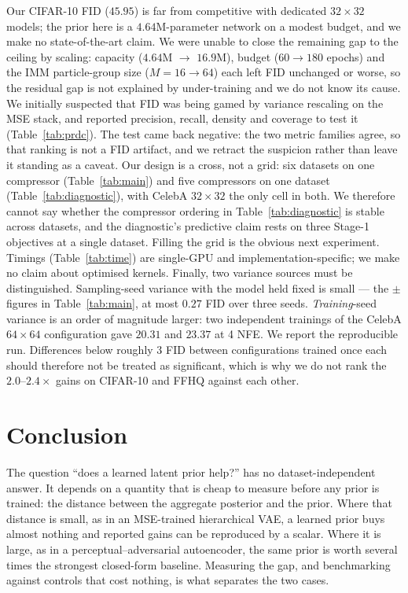 \documentclass[sigconf,nonacm]{acmart}
\begin{document}
Our CIFAR-10 FID ($45.95$) is far from competitive with dedicated
$32{\times}32$ models; the prior here is a $4.64$M-parameter network on a
modest budget, and we make no state-of-the-art claim. We were unable to close
the remaining gap to the ceiling by scaling: capacity ($4.64$M $\to$ $16.9$M),
budget ($60 \to 180$ epochs) and the IMM particle-group size ($M{=}16 \to 64$)
each left FID unchanged or worse, so the residual gap is not explained by
under-training and we do not know its cause. We initially suspected that FID was being gamed by variance
rescaling on the MSE stack, and reported precision, recall, density and coverage
to test it (Table~\ref{tab:prdc}). The test came back negative: the two metric
families agree, so that ranking is not a FID artifact, and we retract the
suspicion rather than leave it standing as a caveat. Our design is a cross, not a grid: six datasets on one compressor
(Table~\ref{tab:main}) and five compressors on one dataset
(Table~\ref{tab:diagnostic}), with CelebA $32{\times}32$ the only cell in both.
We therefore cannot say whether the compressor ordering in
Table~\ref{tab:diagnostic} is stable across datasets, and the diagnostic's
predictive claim rests on three Stage-1 objectives at a single dataset. Filling
the grid is the obvious next experiment. Timings (Table~\ref{tab:time}) are
single-GPU and implementation-specific; we make no claim about optimised
kernels. Finally,
two variance sources must be distinguished. Sampling-seed variance with the
model held fixed is small --- the $\pm$ figures in Table~\ref{tab:main}, at most
$0.27$ FID over three seeds. \emph{Training}-seed variance is an order of
magnitude larger: two independent trainings of the CelebA $64{\times}64$
configuration gave $20.31$ and $23.37$ at 4 NFE. We report the reproducible run.
Differences below roughly $3$ FID between configurations trained once each
should therefore not be treated as significant, which is why we do not rank the
$2.0$--$2.4\times$ gains on CIFAR-10 and FFHQ against each other.

\section{Conclusion}

The question ``does a learned latent prior help?'' has no dataset-independent
answer. It depends on a quantity that is cheap to measure before any prior is
trained: the distance between the aggregate posterior and the prior. Where that
distance is small, as in an MSE-trained hierarchical VAE, a learned prior buys
almost nothing and reported gains can be reproduced by a scalar. Where it is
large, as in a perceptual--adversarial autoencoder, the same prior is worth
several times the strongest closed-form baseline. Measuring the gap, and
benchmarking against controls that cost nothing, is what separates the two
cases.
\end{document}
